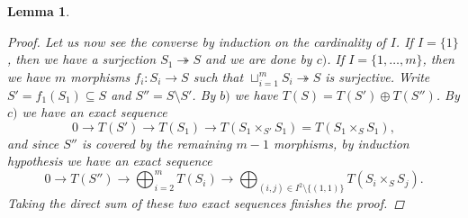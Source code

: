\documentclass[11pt,A4]{article}
\theoremstyle{plain}
\newtheorem{lm}[thm]{Lemma}
\theoremstyle{definition}
\theoremstyle{remark}
\newcommand{\op}{\oplus}
\begin{document}
\begin{lm}
\begin{proof}
	Let us now see the converse by induction on the cardinality of $I$.
	If $I=\{1\}$, then we have a surjection $S_{1}\twoheadrightarrow S$ and we are done by $c)$.
	If $I=\{ 1,\ldots, m\}$, then we have $m$ morphisms $f_{i}\colon S_{i}\to S$ such that $\sqcup_{i=1}^{m} S_{i}\twoheadrightarrow S$ is surjective.
	Write $S'=f_{1}(S_{1})\subseteq S$ and $S''=S\setminus S'$.
	By $b)$ we have $T(S)=T(S')\op T(S'')$.
	By $c)$ we have an exact sequence
	\[ 0\to T(S')\to T(S_{1})\to T(S_{1}\times_{S'}S_{1})=T(S_{1}\times_{S}S_{1}), \]
	and since $S''$ is covered by the remaining $m-1$ morphisms, by induction hypothesis we have an exact sequence
	\[ 0\to T(S'')\to \bigoplus_{i=2}^{m}T(S_{i})\to \bigoplus_{(i,j)\in I^{2}\setminus \{(1,1)\}} T(S_{i}\times_{S}S_{j}). \]
	Taking the direct sum of these two exact sequences finishes the proof.
    \end{proof}
\end{lm}



\end{document}
